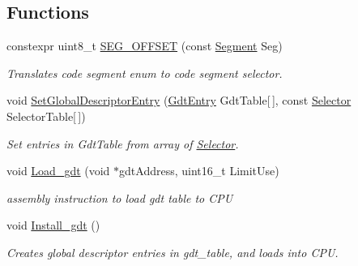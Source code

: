 \subsection*{Functions}
\begin{DoxyCompactItemize}
\item 
constexpr uint8\+\_\+t \hyperlink{namespace_g_d_t_a3f6672477fedb061897f9c710f539ccb}{S\+E\+G\+\_\+\+O\+F\+F\+S\+ET} (const \hyperlink{namespace_g_d_t_af2b09941ee46a489ebaccfed5c839154}{Segment} Seg)
\begin{DoxyCompactList}\small\item\em Translates code segment enum to code segment selector. \end{DoxyCompactList}\item 
void \hyperlink{namespace_g_d_t_a5d0041eb890e6c1f40d8a919494c2354}{Set\+Global\+Descriptor\+Entry} (\hyperlink{union_g_d_t_1_1_gdt_entry}{Gdt\+Entry} Gdt\+Table\mbox{[}$\,$\mbox{]}, const \hyperlink{struct_g_d_t_1_1_selector}{Selector} Selector\+Table\mbox{[}$\,$\mbox{]})
\begin{DoxyCompactList}\small\item\em Set entries in Gdt\+Table from array of \hyperlink{struct_g_d_t_1_1_selector}{Selector}. \end{DoxyCompactList}\item 
void \hyperlink{namespace_g_d_t_a3660563d28e3bab08ddac58ca6844b58}{Load\+\_\+gdt} (void $\ast$gdt\+Address, uint16\+\_\+t Limit\+Use)
\begin{DoxyCompactList}\small\item\em assembly instruction to load gdt table to C\+PU \end{DoxyCompactList}\item 
void \hyperlink{namespace_g_d_t_a174feb7c5a037cc991bf4eb27c256366}{Install\+\_\+gdt} ()
\begin{DoxyCompactList}\small\item\em Creates global descriptor entries in gdt\+\_\+table, and loads into C\+PU. \end{DoxyCompactList}\end{DoxyCompactItemize}
